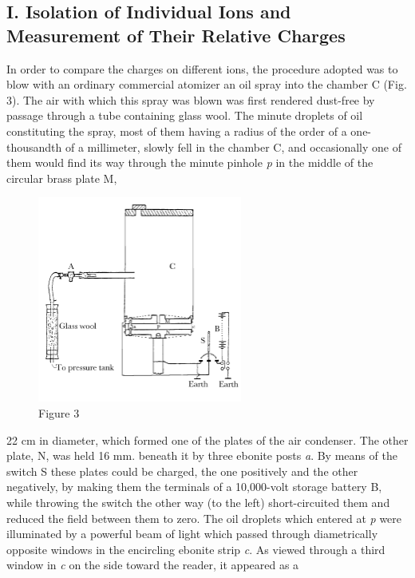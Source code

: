 \subsection*{I. Isolation of Individual Ions and Measurement of Their Relative Charges}

In order to compare the charges on different ions, the procedure adopted
was to blow with an ordinary commercial atomizer an oil spray into the
chamber C (Fig. 3). The air with which this spray was blown was first
rendered dust-free by passage through a tube containing glass wool. The
minute droplets of oil constituting the spray, most of them having a
radius of the order of a one-thousandth of a millimeter, slowly fell in
the chamber C, and occasionally one of them would find its way through
the minute pinhole \emph{p} in the middle of the circular brass plate M,
\begin{figure}[h]
  \begin{center}
    \includegraphics[width=0.6\textwidth]{images/03_millikan/image013.png}
  \end{center}
  \caption*{Figure 3}
\end{figure}
22 cm in diameter, which formed one of the plates of the air condenser.
The other plate, N, was held 16 mm. beneath it by three ebonite posts
\emph{a}. By means of the switch S these plates could be charged, the
one positively and the other negatively, by making them the terminals of
a 10,000-volt storage battery B, while throwing the switch the other way
(to the left) short-circuited them and reduced the field between them to
zero. The oil droplets which entered at \emph{p} were illuminated by a
powerful beam of light which passed through diametrically opposite
windows in the encircling ebonite strip \emph{c}. As viewed through a
third window in \emph{c} on the side toward the reader, it appeared as a
